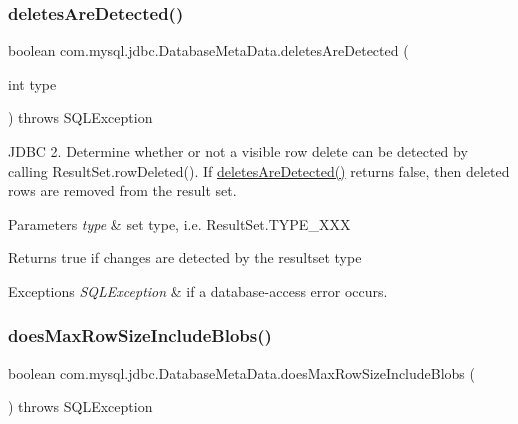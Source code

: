 \subsubsection{\texorpdfstring{deletes\+Are\+Detected()}{deletesAreDetected()}}
{\footnotesize\ttfamily boolean com.\+mysql.\+jdbc.\+Database\+Meta\+Data.\+deletes\+Are\+Detected (\begin{DoxyParamCaption}\item[{int}]{type }\end{DoxyParamCaption}) throws S\+Q\+L\+Exception}

J\+D\+BC 2. Determine whether or not a visible row delete can be detected by calling Result\+Set.\+row\+Deleted(). If \mbox{\hyperlink{classcom_1_1mysql_1_1jdbc_1_1_database_meta_data_a2285b39a35023c91168afdebbfd4e935}{deletes\+Are\+Detected()}} returns false, then deleted rows are removed from the result set.


\begin{DoxyParams}{Parameters}
{\em type} & set type, i.\+e. Result\+Set.\+T\+Y\+P\+E\+\_\+\+X\+XX \\
\hline
\end{DoxyParams}
\begin{DoxyReturn}{Returns}
true if changes are detected by the resultset type 
\end{DoxyReturn}

\begin{DoxyExceptions}{Exceptions}
{\em S\+Q\+L\+Exception} & if a database-\/access error occurs. \\
\hline
\end{DoxyExceptions}
\mbox{\label{classcom_1_1mysql_1_1jdbc_1_1_database_meta_data_a7efb88b6c4c1890107716849cdefbbb7}} 
\subsubsection{\texorpdfstring{does\+Max\+Row\+Size\+Include\+Blobs()}{doesMaxRowSizeIncludeBlobs()}}
{\footnotesize\ttfamily boolean com.\+mysql.\+jdbc.\+Database\+Meta\+Data.\+does\+Max\+Row\+Size\+Include\+Blobs (\begin{DoxyParamCaption}{ }\end{DoxyParamCaption}) throws S\+Q\+L\+Exception}

